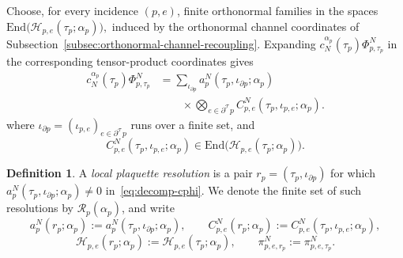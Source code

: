 \documentclass[11pt,a4paper,reqno]{amsart}
\theoremstyle{definition}
\newtheorem{definition}[theorem]{Definition}
\theoremstyle{remark}
\newcommand\End{{\mathrm{End}}}
\begin{document}
Choose, for every incidence $(p,e)$, finite orthonormal families in the spaces $\End\bigl(\mathcal H_{p,e}(\tau_p;\alpha_p)\bigr),$ induced by the orthonormal channel coordinates of Subsection~\ref{subsec:orthonormal-channel-recoupling}. Expanding $c_N^{\alpha_p}(\tau_p)\Phi^N_{p,\tau_p}$ in the corresponding tensor-product coordinates gives
\begin{equation}\label{eq:decomp-cphi}
\begin{aligned}
c_N^{\alpha_p}(\tau_p)\Phi^N_{p,\tau_p}
&=\sum_{\iota_{\partial p}}
a_p^N(\tau_p,\iota_{\partial p};\alpha_p)\\
&\qquad\times
\bigotimes_{e\in\partial^{\mathcal T}p}
C^N_{p,e}(\tau_p,\iota_{p,e};\alpha_p).
\end{aligned}
\end{equation}
where $\iota_{\partial p}=(\iota_{p,e})_{e\in\partial^{\mathcal T} p}$ runs over a finite set, and
\[
C^N_{p,e}(\tau_p,\iota_{p,e};\alpha_p)
\in\End\bigl(\mathcal H_{p,e}(\tau_p;\alpha_p)\bigr).
\]

\begin{definition}
A \emph{local plaquette resolution} is a pair $r_p=(\tau_p,\iota_{\partial p})$ for which $a_p^N(\tau_p,\iota_{\partial p};\alpha_p)\neq 0$ in~\eqref{eq:decomp-cphi}. We denote the finite set of such resolutions by $\mathcal R_p(\alpha_p)$, and write
\[
a_p^N(r_p;\alpha_p):=a_p^N(\tau_p,\iota_{\partial p};\alpha_p),\qquad C^N_{p,e}(r_p;\alpha_p):=C^N_{p,e}(\tau_p,\iota_{p,e};\alpha_p),
\]
\[
\mathcal H_{p,e}(r_p;\alpha_p):=\mathcal H_{p,e}(\tau_p;\alpha_p),\qquad\pi^N_{p,e,r_p}:=\pi^N_{p,e,\tau_p}.
\]
\end{definition}
\end{document}

